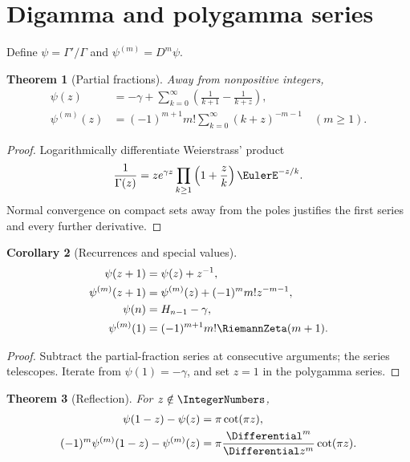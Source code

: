\documentclass[11pt,a4paper,oneside,openany]{book}
\newtheorem{theorem}{Theorem}[chapter]
\newtheorem{corollary}[theorem]{Corollary}
\theoremstyle{definition}
\theoremstyle{remark}
\begin{document}
\section{Digamma and polygamma series}

Define $\psi=\Gamma'/\Gamma$ and $\psi^{(m)}=D^m\psi$.

\begin{theorem}[Partial fractions]
\label{thm:merged-polygamma-series}
Away from nonpositive integers,
\begin{align}
 \psi(z)&=-\gamma+\sum_{k=0}^{\infty}
     \left(\frac1{k+1}-\frac1{k+z}\right),                          \label{eq:merged-digamma-series}\\
 \psi^{(m)}(z)&=(-1)^{m+1}m!\sum_{k=0}^{\infty}(k+z)^{-m-1}
 \quad(m\geq1).                                                     \label{eq:merged-polygamma-series}
\end{align}
\end{theorem}

\begin{proof}
Logarithmically differentiate Weierstrass' product
\[
 \frac1{\Gamma(z)}=ze^{\gamma z}
 \prod_{k\geq1}\left(1+\frac zk\right)\EulerE^{-z/k}.
\]
Normal convergence on compact sets away from the poles justifies the first
series and every further derivative.
\end{proof}

\begin{corollary}[Recurrences and special values]
\begin{align}
 \psi(z+1)&=\psi(z)+z^{-1},                                         \label{eq:merged-digamma-rec}\\
 \psi^{(m)}(z+1)&=\psi^{(m)}(z)+(-1)^mm!z^{-m-1},                   \label{eq:merged-polygamma-rec}\\
 \psi(n)&=H_{n-1}-\gamma,                                           \label{eq:merged-digamma-int}\\
 \psi^{(m)}(1)&=(-1)^{m+1}m!\RiemannZeta(m+1).                     \label{eq:merged-polygamma-one}
\end{align}
\end{corollary}

\begin{proof}
Subtract the partial-fraction series at consecutive arguments; the series
telescopes.  Iterate from $\psi(1)=-\gamma$, and set $z=1$ in the polygamma
series.
\end{proof}

\begin{theorem}[Reflection]
\label{thm:merged-polygamma-reflection}
For $z\notin\IntegerNumbers$,
\begin{align}
 \psi(1-z)-\psi(z)&=\pi\cot(\pi z),                                 \label{eq:merged-digamma-reflection}\\
 (-1)^m\psi^{(m)}(1-z)-\psi^{(m)}(z)
 &=\pi\frac{\Differential^m}{\Differential z^m}\cot(\pi z).                            \label{eq:merged-polygamma-reflection}
\end{align}
\end{theorem}
\end{document}
